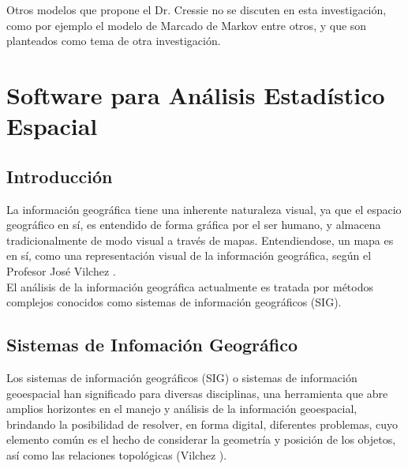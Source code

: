 \documentclass[12pt]{report}
\begin{document}
			
			
	
	
			
	Otros modelos que  propone el Dr. Cressie no se discuten en esta investigación, como por ejemplo  el modelo de Marcado de Markov entre otros, y que son planteados como tema de otra investigación. 
			
		\chapter{Software para Análisis Estadístico Espacial}
			
		
			
			\section*{Introducción}
			
			La información geográfica tiene una inherente naturaleza visual, ya que el espacio geográfico en sí, es entendido de forma gráfica por el ser humano,  y  almacena tradicionalmente de modo  visual a través de  mapas. Entendiendose, un mapa es en sí, como una representación visual de la información geográfica, según el Profesor José Vilchez \cite{Vilchez}.		  \\
			   El análisis de la información geográfica actualmente es tratada por métodos complejos conocidos como sistemas de información geográficos (SIG).\\
		    
		   
			\section{Sistemas de Infomación Geográfico}{\label{SIG1} }
			
			
			Los sistemas de información geográficos (SIG) o sistemas de información geoespacial han significado para diversas disciplinas, una herramienta que abre amplios  horizontes en el manejo y análisis de la información geoespacial, brindando la posibilidad de resolver, en forma digital, diferentes problemas, cuyo elemento común es el hecho de considerar la geometría y posición de los objetos, así como las relaciones topológicas (Vilchez \cite{ Vilchez}). \\
			
\end{document}
